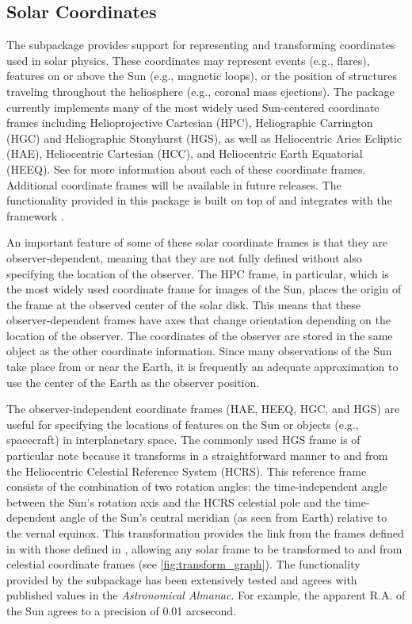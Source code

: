 \subsection{Solar Coordinates}
\label{sec:coords}

The  subpackage provides support for representing and transforming coordinates used in solar physics.
These coordinates may represent events (e.g., flares), features on or above the Sun (e.g., magnetic loops), or the position of structures traveling throughout the heliosphere (e.g., coronal mass ejections).
The package currently implements many of the most widely used Sun-centered coordinate frames including Helioprojective Cartesian (HPC), Heliographic Carrington (HGC) and Heliographic Stonyhurst (HGS), as well as Heliocentric Aries Ecliptic (HAE), Heliocentric Cartesian (HCC), and Heliocentric Earth Equatorial (HEEQ).
See \citet{2006A&A...449..791T} for more information about each of these coordinate frames.
Additional coordinate frames will be available in future releases.
The functionality provided in this package is built on top of and integrates with the  framework \citep[see Section 3.3 of][]{astropy2018}.

An important feature of some of these solar coordinate frames is that they are observer-dependent, meaning that they are not fully defined without also specifying the location of the observer.
The HPC frame, in particular, which is the most widely used coordinate frame for images of the Sun, places the origin of the frame at the observed center of the solar disk.
This means that these observer-dependent frames have axes that change orientation depending on the location of the observer.
The coordinates of the observer are stored in the same object as the other coordinate information.
Since many observations of the Sun take place from or near the Earth, it is frequently an adequate approximation to use the center of the Earth as the observer position.

The observer-independent coordinate frames (HAE, HEEQ, HGC, and HGS) are useful for specifying the locations of features on the Sun or objects (e.g., spacecraft) in interplanetary space.
The commonly used HGS frame is of particular note because it transforms in a straightforward manner to and from the Heliocentric Celestial Reference System (HCRS).
This reference frame consists of the combination of two rotation angles: the time-independent angle between the Sun's rotation axis and the HCRS celestial pole \citep[see][]{2007CeMDA..98..155S} and the time-dependent angle of the Sun's central meridian (as seen from Earth) relative to the vernal equinox.
This transformation provides the link from the frames defined in  with those defined in , allowing any solar frame to be transformed to and from celestial coordinate frames (see \autoref{fig:transform_graph}).
The functionality provided by the  subpackage has been extensively tested and agrees with published values in the \textit{Astronomical Almanac}.
For example, the apparent R.A. of the Sun agrees to a precision of 0.01 arcsecond.

